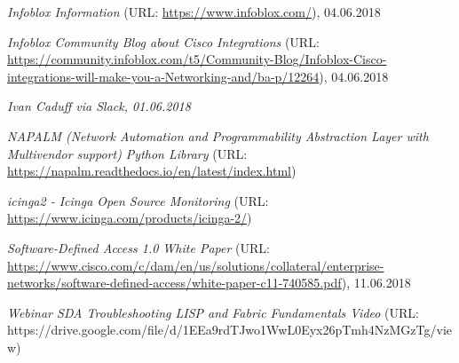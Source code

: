 \begin{thebibliography}{}
	 \textit{Infoblox Information} (URL: \url{https://www.infoblox.com/}), 04.06.2018
	
	 \textit{Infoblox Community Blog about Cisco Integrations} (URL: \url{https://community.infoblox.com/t5/Community-Blog/Infoblox-Cisco-integrations-will-make-you-a-Networking-and/ba-p/12264}), 04.06.2018
	
	 \textit{Ivan Caduff via Slack, 01.06.2018}
	
	 \textit{NAPALM (Network Automation and Programmability Abstraction Layer with Multivendor support) Python Library} (URL: \url{https://napalm.readthedocs.io/en/latest/index.html})
	
	 \textit{icinga2 - Icinga Open Source Monitoring} (URL: \url{https://www.icinga.com/products/icinga-2/})
	
	 \textit{Software-Defined Access 1.0 White Paper} (URL: \url{https://www.cisco.com/c/dam/en/us/solutions/collateral/enterprise-networks/software-defined-access/white-paper-c11-740585.pdf}), 11.06.2018
	
	 \textit{Webinar SDA Troubleshooting LISP and Fabric Fundamentals Video} (URL: https://drive.google.com/file/d/1EEa9rdTJwo1WwL0Eyx26pTmh4NzMGzTg/view)
	
\end{thebibliography}
